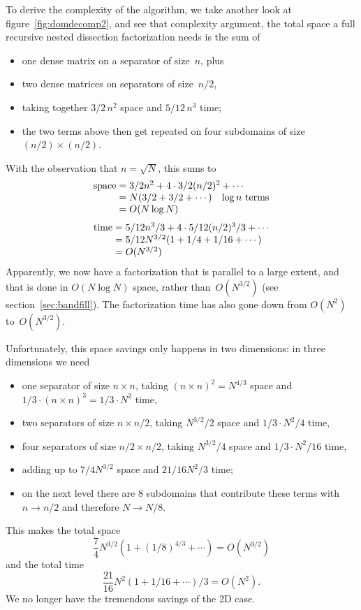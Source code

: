 To derive the complexity of the algorithm, we take another look at
figure~\ref{fig:domdecomp2}, and see that
complexity argument, the total space a full recursive nested
dissection factorization needs is the sum of
\begin{itemize}
\item one dense matrix on a separator of size~$n$, plus
\item two dense matrices on separators of size~$n/2$,
\item taking together $3/2\,n^2$ space and $5/12\,n^3$ time;
\item the two terms above then get repeated on four subdomains of
  size $(n/2)\times(n/2)$.
\end{itemize}
With the observation that $n=\sqrt N$, this sums to
\[ 
\begin{array}{r@{{}={}}l}
\mathrm{space}&3/2n^2+4\cdot 3/2(n/2)^2+\cdots\\
   & N(3/2+3/2+\cdots)\quad\hbox{$\log n$ terms}\\
   & O(N\log N)
\end{array}
\]
\[ 
\begin{array}{r@{{}={}}l}
\mathrm{time}&5/12n^3/3+4\cdot 5/12(n/2)^3/3+\cdots\\
   & 5/12 N^{3/2}(1+1/4+1/16+\cdots)\\
   & O(N^{3/2})
\end{array}
\]
Apparently, we now have a factorization that is parallel to a large
extent, and that is done in $O(N\log N)$ space, rather than~$O(N^{3/2})$
(see section~\ref{sec:bandfill}). The factorization time has also gone
down from $O(N^2)$ to~$O(N^{3/2})$.

Unfortunately, this space savings only happens in two dimensions: in three
dimensions we need
\begin{itemize}
\item one separator of size $n\times n$, taking $(n\times
  n)^2=N^{4/3}$ space and $1/3\cdot (n\times n)^3=1/3\cdot N^2$ time,
\item two separators of size $n\times n/2$, taking $N^{3/2}/2$ space and
  $1/3\cdot N^2/4$ time,
\item four separators of size $n/2\times n/2$, taking $N^{3/2}/4$ space
  and $1/3\cdot N^2/16$ time,
\item adding up to $7/4 N^{3/2}$ space and $21/16 N^2/3$ time;
\item on the next level there are 8 subdomains that contribute these
  terms with $n\rightarrow n/2$ and therefore $N\rightarrow N/8$.
\end{itemize}
This makes the total space
\[ \frac{7}{4}N^{3/2}(1+(1/8)^{4/3}+\cdots)=O(N^{3/2}) \]
and the total time
\[ \frac{21}{16}N^2(1+1/16+\cdots)/3=O(N^2). \]
We no longer have the tremendous savings of the 2D case.

